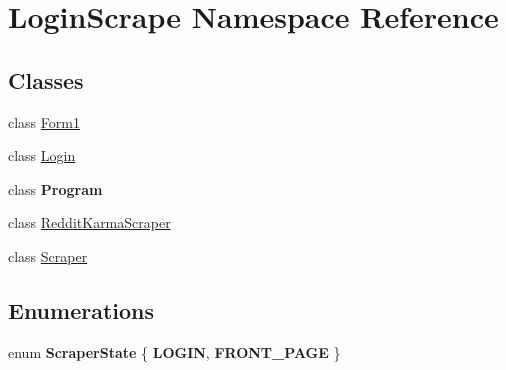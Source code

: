 \hypertarget{namespace_login_scrape}{}\section{Login\+Scrape Namespace Reference}
\label{namespace_login_scrape}
\subsection*{Classes}
\begin{DoxyCompactItemize}
\item 
class \hyperlink{class_login_scrape_1_1_form1}{Form1}
\item 
class \hyperlink{class_login_scrape_1_1_login}{Login}
\item 
class {\bfseries Program}
\item 
class \hyperlink{class_login_scrape_1_1_reddit_karma_scraper}{Reddit\+Karma\+Scraper}
\item 
class \hyperlink{class_login_scrape_1_1_scraper}{Scraper}
\end{DoxyCompactItemize}
\subsection*{Enumerations}
\begin{DoxyCompactItemize}
\item 
\hypertarget{namespace_login_scrape_a5a49771eff6d809d7c335f178ab22286}{}enum {\bfseries Scraper\+State} \{ {\bfseries L\+O\+G\+I\+N}, 
{\bfseries F\+R\+O\+N\+T\+\_\+\+P\+A\+G\+E}
 \}\label{namespace_login_scrape_a5a49771eff6d809d7c335f178ab22286}

\end{DoxyCompactItemize}
